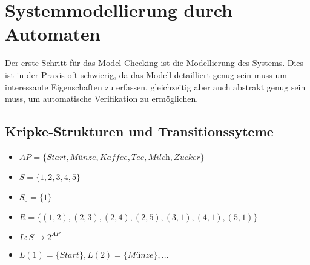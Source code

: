 \section{Systemmodellierung durch Automaten}
\label{sec:para2}
\nextlecture

Der erste Schritt für das Model-Checking ist die Modellierung des Systems. Dies ist in der Praxis oft schwierig, da das Modell detailliert genug sein muss um interessante Eigenschaften zu erfassen, gleichzeitig aber auch abstrakt genug sein muss, um automatische Verifikation zu ermöglichen.

\subsection{Kripke-Strukturen und Transitionssyteme}
\begin{bsp}
	\mbox{}
	\begin{center}
	\end{center}

	\begin{itemize}
		\item $AP = \{\textit{Start}, \textit{Münze}, \textit{Kaffee}, \textit{Tee}, \textit{Milch}, \textit{Zucker}\}$
		\item $S = \{1,2,3,4,5\}$
		\item $S_0 = \{1\}$
		\item $R = \{(1,2),(2,3),(2,4),(2,5),(3,1),(4,1),(5,1)\}$
		\item $L:S\rightarrow2^{AP}$
		\item $L(1) = \{\textit{Start}\}, L(2)=\{\textit{Münze}\}, \dots$
	\end{itemize}
\end{bsp}

